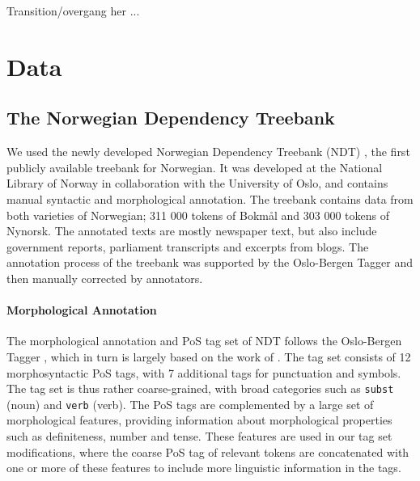 \documentclass[11pt,a4paper]{article}
\begin{document}
Transition/overgang her ...

\section{Data}
\label{sec:data}
\subsection{The Norwegian Dependency Treebank}
We used the newly developed Norwegian Dependency Treebank (NDT)
\cite{Sol:Skj:Ovr:14},  the first publicly available treebank for Norwegian. It
was developed at the National Library of Norway in collaboration with the
University of Oslo, and contains manual syntactic and morphological annotation.
The treebank contains data from both varieties of Norwegian; 311 000 tokens of
Bokmål and 303 000 tokens of Nynorsk. The annotated texts are mostly newspaper
text, but also include government reports, parliament transcripts and excerpts
from blogs. The annotation process of the treebank was supported by the
Oslo-Bergen Tagger \cite{Hag:Joh:Nok:00} and then manually corrected by
annotators.


\paragraph{Morphological Annotation}
The morphological annotation and PoS tag set of NDT follows the Oslo-Bergen
Tagger \cite{Hag:Joh:Nok:00,Sol:13}, which in turn is largely based on the work
of . The tag set consists of 12 morphosyntactic PoS
tags, with 7 additional tags for punctuation and symbols.  The tag set is thus
rather coarse-grained, with broad categories such as \texttt{subst} (noun) and
\texttt{verb} (verb). The PoS tags are complemented by a large set of
morphological features, providing information about morphological properties such as
definiteness, number and tense. These features are used in our tag set
modifications, where the coarse PoS tag of relevant tokens are concatenated
with one or more of these features to include more linguistic information in
the tags.
\end{document}
